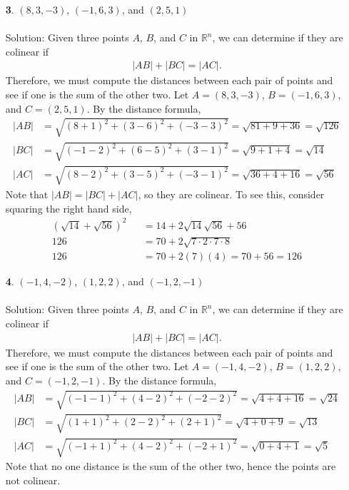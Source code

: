\documentclass[12pt]{amsbook}
\begin{document}
\begin{enumerate}
  \item[{\small \bf 3}.] $(8,3,-3)$, $(-1,6,3)$, and $(2,5,1)$\\
  \\
  {\sc Solution}: Given three points $A$, $B$, and $C$ in $\mathbb{R}^n$, we can determine if they are colinear if
  \begin{align*}
|AB|+|BC|=|AC|.
\end{align*}
Therefore, we must compute the distances between each pair of points and see if one is the sum of the other two. Let $A=(8,3,-3)$, $B=(-1,6,3)$, and $C=(2,5,1)$. By the distance formula,
\begin{align*}
|AB|&=\sqrt{(8+1)^2+(3-6)^2+(-3-3)^2}=\sqrt{81+9+36}=\sqrt{126}\\
|BC|&=\sqrt{(-1-2)^2+(6-5)^2+(3-1)^2}=\sqrt{9+1+4}=\sqrt{14}\\
|AC|&=\sqrt{(8-2)^2+(3-5)^2+(-3-1)^2}=\sqrt{36+4+16}=\sqrt{56}
\end{align*}
Note that $|AB|=|BC|+|AC|$, so they are colinear. To see this, consider squaring the right hand side,
\begin{eqnarray*}
(\sqrt{14}+\sqrt{56})^2 &&=14+2\sqrt{14}\sqrt{56}+56 \\
126&&=70+2\sqrt{7\cdot 2\cdot 7\cdot 8}\\
126&&=70+2(7)(4)=70+56=126
\end{eqnarray*}
  \item[{\small \bf 4}.] $(-1,4,-2)$, $(1,2,2)$, and $(-1,2,-1)$\\
  \\
  {\sc Solution}: Given three points $A$, $B$, and $C$ in $\mathbb{R}^n$, we can determine if they are colinear if
  \begin{align*}
|AB|+|BC|=|AC|.
\end{align*}
Therefore, we must compute the distances between each pair of points and see if one is the sum of the other two. Let $A=(-1,4,-2)$, $B=(1,2,2)$, and $C=(-1,2,-1)$. By the distance formula,
\begin{align*}
|AB|&=\sqrt{(-1-1)^2+(4-2)^2+(-2-2)^2}=\sqrt{4+4+16}=\sqrt{24}\\
|BC|&=\sqrt{(1+1)^2+(2-2)^2+(2+1)^2}=\sqrt{4+0+9}=\sqrt{13}\\
|AC|&=\sqrt{(-1+1)^2+(4-2)^2+(-2+1)^2}=\sqrt{0+4+1}=\sqrt{5}
\end{align*}
Note that no one distance is the sum of the other two, hence the points are not colinear.
\\
\end{enumerate}
\end{document}
